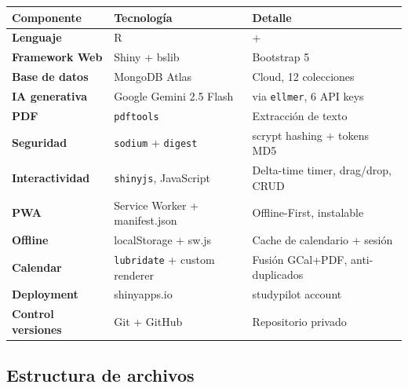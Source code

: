\documentclass[
  spanish,
  11pt,
  a4paper,
]{article}
\newcounter{none} %
\begin{document}
{\def\LTcaptype{none} %
\begin{longtable}[]{@{}
  >{\raggedright\arraybackslash}p{}
  >{\raggedright\arraybackslash}p{}
  >{\raggedright\arraybackslash}p{}@{}}
\toprule\noalign{}
\begin{minipage}[b]{\linewidth}\raggedright
Componente
\end{minipage} & \begin{minipage}[b]{\linewidth}\raggedright
Tecnología
\end{minipage} & \begin{minipage}[b]{\linewidth}\raggedright
Detalle
\end{minipage} \\
\midrule\noalign{}
\endhead
\bottomrule\noalign{}
\endlastfoot
\textbf{Lenguaje} & R & 4.5+ \\
\textbf{Framework Web} & Shiny + bslib & Bootstrap 5 \\
\textbf{Base de datos} & MongoDB Atlas & Cloud, 12 colecciones \\
\textbf{IA generativa} & Google Gemini 2.5 Flash & via \texttt{ellmer},
6 API keys \\
\textbf{PDF} & \texttt{pdftools} & Extracción de texto \\
\textbf{Seguridad} & \texttt{sodium} + \texttt{digest} & scrypt hashing
+ tokens MD5 \\
\textbf{Interactividad} & \texttt{shinyjs}, JavaScript & Delta-time
timer, drag/drop, CRUD \\
\textbf{PWA} & Service Worker + manifest.json & Offline-First,
instalable \\
\textbf{Offline} & localStorage + sw.js & Cache de calendario +
sesión \\
\textbf{Calendar} & \texttt{lubridate} + custom renderer & Fusión
GCal+PDF, anti-duplicados \\
\textbf{Deployment} & shinyapps.io & studypilot account \\
\textbf{Control versiones} & Git + GitHub & Repositorio privado \\
\end{longtable}
}

\subsection{Estructura de archivos}\label{estructura-de-archivos}
\end{document}
